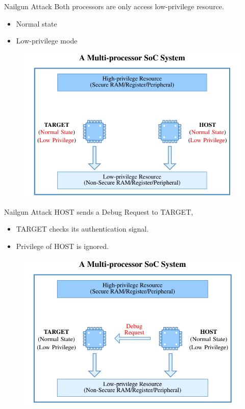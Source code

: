 \documentclass{beamer}
\begin{document}
\begin{frame}{Nailgun Attack}
    Both processors are only access low-privilege resource.
\begin{itemize}
    \item Normal state
    \item Low-privilege mode
\end{itemize}
    \begin{figure}
        \centering
        \includegraphics[scale=.40]{SUSTech-Beamer-Theme/pic/Nailgun4.png}
        \label{fig:my_label}
    \end{figure}
\end{frame}

\begin{frame}{Nailgun Attack}
    HOST sends a Debug Request to TARGET,
\begin{itemize}
    \item TARGET checks its authentication signal.
    \item Privilege of HOST is ignored.
\end{itemize}
    \begin{figure}
        \centering
        \includegraphics[scale=.40]{SUSTech-Beamer-Theme/pic/Nailgun5.png}
        \label{fig:my_label}
    \end{figure}
\end{frame}
\end{document}
